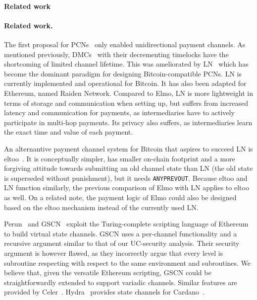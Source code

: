 \makeatletter%
%
  {\paragraph{Related work}}%
  {\paragraph{Related work.}}%
\makeatother%
 The first proposal for PCNs~\cite{spilman} only enabled
 unidirectional payment channels. As mentioned previously, DMCs~\cite{decker}
 with their decrementing timelocks have the shortcoming of limited channel
 lifetime. This was ameliorated by LN~\cite{lightning} which has become the dominant paradigm for designing Bitcoin-compatible PCNs.
 LN is currently implemented and operational for
  Bitcoin. It has also been adapted for Ethereum, named
  Raiden Network. Compared to Elmo, LN is more lightweight in terms of
  storage and communication when setting up, but suffers from increased latency
  and communication for payments, as intermediaries have to actively participate
  in multi-hop payments. Its privacy also suffers, as intermediaries
  learn the exact time and value of each payment.

  An alternantive payment channel system for Bitcoin that aspires to
  succeed LN is eltoo~\cite{eltoo}. It is conceptually simpler,
  has smaller on-chain footprint and a more forgiving attitude towards
  submitting an old channel state than LN (the old state is superseded without punishment), but it needs
  \texttt{ANYPREVOUT}. Because eltoo and LN function similarly, the previous comparison of
  Elmo with LN applies to eltoo as well. On a related note, the payment
  logic of Elmo could also be designed based on the eltoo mechanism instead of
  the currently used LN.

Perun~\cite{perun} and GSCN~\cite{DBLP:conf/ccs/DziembowskiFH18} exploit the
  Turing-complete scripting language of Ethereum to build virtual state
  channels.
  GSCN uses a per-channel functionality and a recursive argument similar
  to that of our UC-security analysis. Their security argument is however
  flawed, as they incorrectly argue that every level is subroutine respecting
  with respect to the same environment and subroutines.
  We believe that, given the versatile Ethereum scripting, GSCN could be
  straightforwardly extended to support variadic channels.
  Similar features are provided by Celer~\cite{dong2018celer}.
  Hydra~\cite{cryptoeprint:2020:299} provides state channels for
  Cardano~\cite{cardano}.


